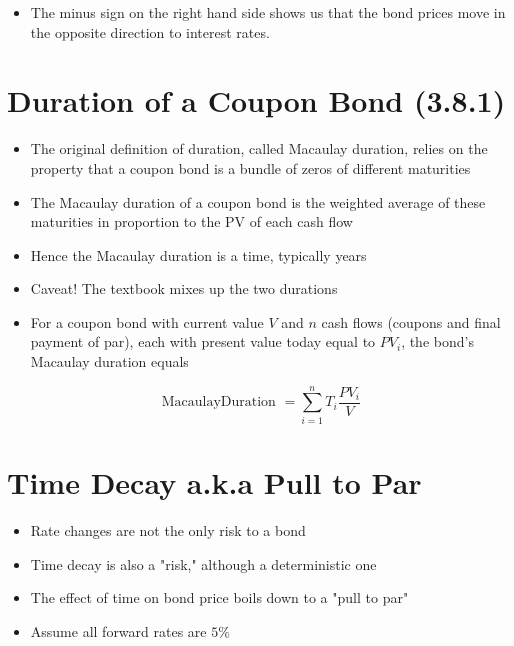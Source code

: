 \documentclass[letterpaper]{article}
\begin{document}
\begin{itemize}
  \item The minus sign on the right hand side shows us that the bond prices move in the opposite direction to interest rates.
\end{itemize}

\section*{Duration of a Coupon Bond (3.8.1)}
\begin{itemize}
  \item The original definition of duration, called Macaulay duration, relies on the property that a coupon bond is a bundle of zeros of different maturities
  \item The Macaulay duration of a coupon bond is the weighted average of these maturities in proportion to the PV of each cash flow
  \item Hence the Macaulay duration is a time, typically years
  \item Caveat! The textbook mixes up the two durations
  \item For a coupon bond with current value $V$ and $n$ cash flows (coupons and final payment of par), each with present value today equal to $P V_{i}$, the bond's Macaulay duration equals
\end{itemize}

$$
\text { MacaulayDuration }=\sum_{i=1}^{n} T_{i} \frac{P V_{i}}{V}
$$

\section*{Time Decay a.k.a Pull to Par}
\begin{itemize}
  \item Rate changes are not the only risk to a bond
  \item Time decay is also a "risk," although a deterministic one
  \item The effect of time on bond price boils down to a "pull to par"
  \item Assume all forward rates are $5 \%$
\end{itemize}
\end{document}
